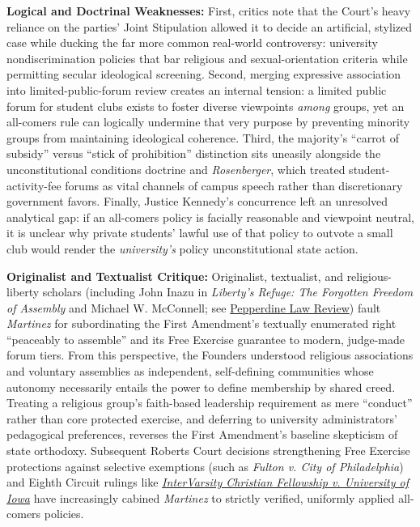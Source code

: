 \documentclass[12pt]{article}
\begin{document}
\textbf{Logical and Doctrinal Weaknesses:} First, critics note that the Court's heavy reliance on the parties' Joint Stipulation allowed it to decide an artificial, stylized case while ducking the far more common real-world controversy: university nondiscrimination policies that bar religious and sexual-orientation criteria while permitting secular ideological screening. Second, merging expressive association into limited-public-forum review creates an internal tension: a limited public forum for student clubs exists to foster diverse viewpoints \textit{among} groups, yet an all-comers rule can logically undermine that very purpose by preventing minority groups from maintaining ideological coherence. Third, the majority's ``carrot of subsidy'' versus ``stick of prohibition'' distinction sits uneasily alongside the unconstitutional conditions doctrine and \textit{Rosenberger}, which treated student-activity-fee forums as vital channels of campus speech rather than discretionary government favors. Finally, Justice Kennedy's concurrence left an unresolved analytical gap: if an all-comers policy is facially reasonable and viewpoint neutral, it is unclear why private students' lawful use of that policy to outvote a small club would render the \textit{university's} policy unconstitutional state action.

\textbf{Originalist and Textualist Critique:} Originalist, textualist, and religious-liberty scholars (including John Inazu in \textit{Liberty's Refuge: The Forgotten Freedom of Assembly} and Michael W. McConnell; see \href{https://digitalcommons.pepperdine.edu/cgi/viewcontent.cgi?article=2355&context=plr}{Pepperdine Law Review}) fault \textit{Martinez} for subordinating the First Amendment's textually enumerated right ``peaceably to assemble'' and its Free Exercise guarantee to modern, judge-made forum tiers. From this perspective, the Founders understood religious associations and voluntary assemblies as independent, self-defining communities whose autonomy necessarily entails the power to define membership by shared creed. Treating a religious group's faith-based leadership requirement as mere ``conduct'' rather than core protected exercise, and deferring to university administrators' pedagogical preferences, reverses the First Amendment's baseline skepticism of state orthodoxy. Subsequent Roberts Court decisions strengthening Free Exercise protections against selective exemptions (such as \textit{Fulton v. City of Philadelphia}) and Eighth Circuit rulings like \href{https://becketfund.org/case/intervarsity-christian-fellowship-v-university-iowa/}{\textit{InterVarsity Christian Fellowship v. University of Iowa}} have increasingly cabined \textit{Martinez} to strictly verified, uniformly applied all-comers policies.
\end{document}
